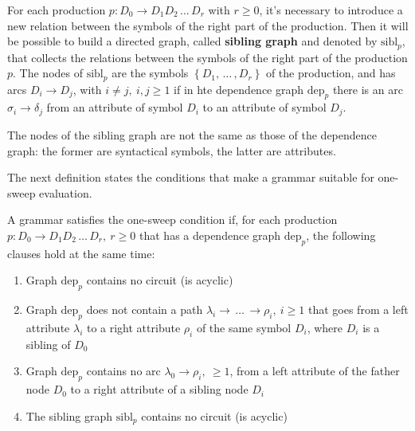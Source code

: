 \documentclass[english]{article}
\begin{document}
For each production \(p: D_0 \rightarrow D_1 D_2 \,\ldots\, D_r\) with \(r \geq 0\), it's necessary to introduce a new relation between the symbols of the right part of the production.
Then it will be possible to build a directed graph, called \textbf{sibling graph} and denoted by \(\text{sibl}_p\), that collects the relations between the symbols of the right part of the production \(p\).
The nodes of \(\text{sibl}_p\) are the symbols \(\left\{ D_1, \,\ldots\, , D_r \right\}\) of the production, and has arcs \(D_i \rightarrow D_j\), with \(i \neq j, \ i,j \geq 1\) if in hte dependence graph \(\text{dep}_p\) there is an arc \(\sigma_i \rightarrow \delta_j\) from an attribute of symbol \(D_i\) to an attribute of symbol \(D_j\).

The nodes of the sibling graph are not the same as those of the dependence graph:
the former are syntactical symbols, the latter are attributes.

The next definition states the conditions that make a grammar suitable for one-sweep evaluation.

\begin{definition}
  \label{def:one-sweep-grammar-condition}
  A grammar satisfies the one-sweep condition if, for each production \(p : D_0 \rightarrow D_1 D_2 \,\ldots\, D_r, \ r \geq 0\) that has a dependence graph \(\text{dep}_p\), the following clauses hold at the same time:

  \begin{enumerate}[label=\Alph*., ref=(\Alph*)]
    \item\label{enum:one-sweep-grammar-condition-1} Graph \(\text{dep}_p\) contains no circuit (is acyclic)
    \item\label{enum:one-sweep-grammar-condition-2} Graph \(\text{dep}_p\) does not contain a path \(\lambda_i \rightarrow \,\ldots\, \rightarrow \rho_i, \ i \geq 1\) that goes from a left attribute \(\lambda_i\) to a right attribute \(\rho_i\) of the same symbol \(D_i\), where \(D_i\) is a sibling of \(D_0\)
    \item\label{enum:one-sweep-grammar-condition-3} Graph \(\text{dep}_p\) contains no arc \(\lambda_0 \rightarrow \rho_i, \ \geq 1\), from a left attribute of the father node \(D_0\) to a right attribute of a sibling node \(D_i\)
    \item\label{enum:one-sweep-grammar-condition-4} The sibling graph \(\text{sibl}_p\) contains no circuit (is acyclic)
  \end{enumerate}
\end{definition}
\end{document}
